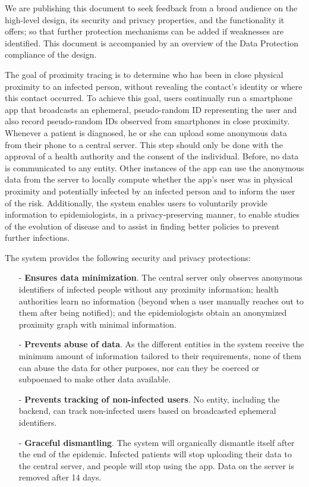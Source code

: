 \documentclass[12pt,a4paper]{article}
\begin{document}
We are publishing this document to seek feedback from a broad audience on the high-level
design, its security and privacy properties, and the functionality it offers; so that further protection mechanisms can be added if weaknesses are identified. This document is
accompanied by an overview of the Data Protection compliance of the design.

The goal of proximity tracing is to determine who has been in close physical proximity to an infected person, without revealing the contact’s identity or where this contact occurred. To achieve this goal, users continually run a smartphone app that broadcasts an ephemeral, pseudo-random ID representing the user and also record pseudo-random IDs observed from smartphones in close proximity. Whenever a patient is diagnosed, he or she can upload some anonymous data from their phone to a central server. This step should only be done  with the approval of a health authority and the consent of the individual. Before, no data is communicated to any entity. Other instances of the app can use the anonymous data from the server to locally compute whether the app’s user was in physical proximity and potentially infected by an infected person and to inform the user of the risk. Additionally, the system enables users to voluntarily provide information to epidemiologists, in a privacy-preserving manner, to enable studies of the evolution of disease and to assist in finding better policies to prevent further infections.

The system provides the following security and privacy protections:
\begin{itemize}\itemsep0pt
\item[-] \textbf{Ensures data minimization}. The central server only observes anonymous identifiers of infected people without any proximity information; health authorities learn no information (beyond when a user manually reaches out to them after being notified);
and the epidemiologists obtain an anonymized proximity graph with minimal information.
\item[-] \textbf{Prevents abuse of data}. As the different entities in the system receive the minimum amount of information tailored to their requirements, none of them can abuse the data for other purposes, nor can they be coerced or subpoenaed to make other data available.
\item[-] \textbf{Prevents tracking of non-infected users}. No entity, including the backend, can track non-infected users based on broadcasted ephemeral identifiers.
\item[-] \textbf{Graceful dismantling}. The system will organically dismantle itself after the end of the epidemic. Infected patients will stop uploading their data to the central server,
and people will stop using the app. Data on the server is removed after 14 days.
\end{itemize}
\clearpage
\end{document}
